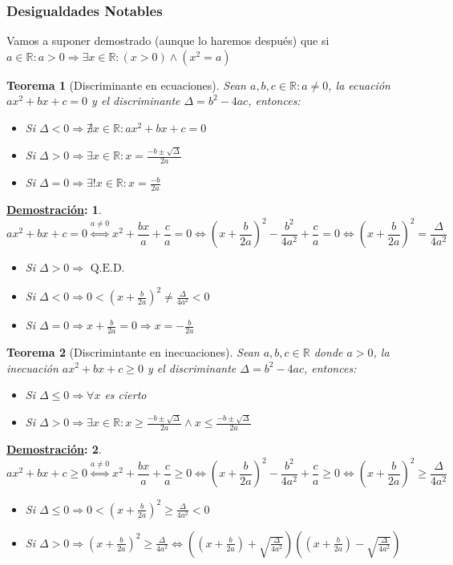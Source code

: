 \documentclass[10pt,a4paper,openright]{book}
\theoremstyle{break}
\newtheorem*{theo}{Teorema}
\newtheorem*{demo}{\underline{Demostración}:}
\begin{document}
\subsubsection{Desigualdades Notables}
Vamos a suponer demostrado (aunque lo haremos después) que si $a\in \mathbb R : a>0\Rightarrow \exists x\in \mathbb R : (x>0)\wedge (x^2=a)$

\begin{theo}[Discriminante en ecuaciones]
Sean $a,b,c\in \mathbb R  : a\neq 0$, la ecuación $ax^2+bx+c=0$ y el discriminante $\Delta=b^2-4ac$, entonces:
\begin{itemize}
\item Si $\Delta<0\Rightarrow \nexists x\in \mathbb R : ax^2+bx+c=0$
\item Si $\Delta>0 \Rightarrow \exists x\in \mathbb R : x=\frac{-b\pm\sqrt{\Delta}}{2a}$
\item Si $\Delta=0 \Rightarrow \exists! x\in \mathbb R : x=\frac{-b}{2a}$
\end{itemize}
\end{theo}
\begin{demo}
$$ax^2+bx+c=0\stackrel{a\neq 0}{\Leftrightarrow} x^2+\frac{bx}{a}+\frac{c}{a}=0\Leftrightarrow (x+\frac{b}{2a})^2-\frac{b^2}{4a^2}+\frac{c}{a}=0\Leftrightarrow (x+\frac{b}{2a})^2=\frac{\Delta}{4a^2}$$
\begin{itemize}
\item Si $\Delta>0\Rightarrow \mbox{ Q.E.D.}$
\item Si $\Delta<0\Rightarrow 0<(x+\frac{b}{2a})^2 \neq \frac{\Delta}{4a^2}<0$
\item Si $\Delta=0\Rightarrow x+\frac{b}{2a}=0\Rightarrow x=-\frac{b}{2a}$
\end{itemize}
\end{demo}

\begin{theo}[Discrimintante en inecuaciones]
Sean $a,b,c\in \mathbb R$ donde $a>0$, la inecuación $ax^2+bx+c\geq 0$ y el discriminante $\Delta=b^2-4ac$, entonces:
\begin{itemize}
\item Si $\Delta\leq 0\Rightarrow \forall x$ es cierto
\item Si $\Delta>0 \Rightarrow \exists x \in \mathbb R : x\geq \frac{-b\pm\sqrt{\Delta}}{2a} \wedge x\leq \frac{-b\pm\sqrt{\Delta}}{2a}$
\end{itemize}
\end{theo}
\begin{demo}
$$ax^2+bx+c\geq 0\stackrel{a\neq 0}{\Leftrightarrow} x^2+\frac{bx}{a}+\frac{c}{a}\geq 0\Leftrightarrow (x+\frac{b}{2a})^2-\frac{b^2}{4a^2}+\frac{c}{a}\geq 0\Leftrightarrow (x+\frac{b}{2a})^2\geq \frac{\Delta}{4a^2}$$
\begin{itemize}
\item Si $\Delta\leq 0\Rightarrow 0<(x+\frac{b}{2a})^2 \geq \frac{\Delta}{4a^2}<0$
\item Si $\Delta>0\Rightarrow (x+\frac{b}{2a})^2 \geq \frac{\Delta}{4a^2}\Leftrightarrow \left((x+\frac{b}{2a})+\sqrt{\frac{\Delta}{4a^2}}\right)\left((x+\frac{b}{2a})-\sqrt{\frac{\Delta}{4a^2}}\right)$
\end{itemize}
\end{demo}
\end{document}

